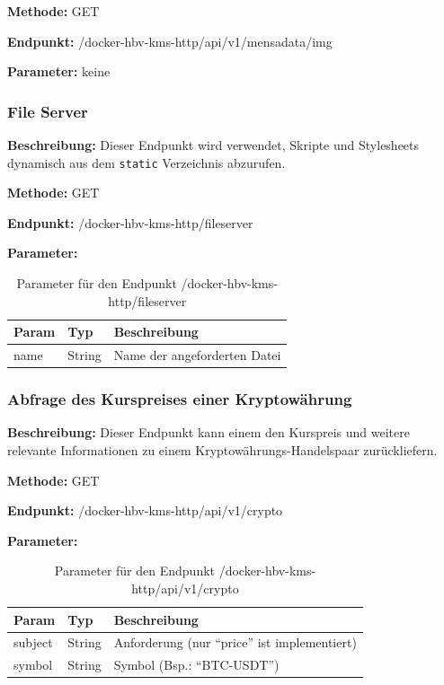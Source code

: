 \textbf{Methode:} GET

\textbf{Endpunkt:} /docker-hbv-kms-http/api/v1/mensadata/img

\textbf{Parameter:} keine

\dotfill

\subsubsection{File Server}
\label{sec:api-fileserver}
\textbf{Beschreibung:} Dieser Endpunkt wird verwendet, Skripte und Stylesheets dynamisch aus dem \verb|static| Verzeichnis
abzurufen.

\textbf{Methode:} GET

\textbf{Endpunkt:} /docker-hbv-kms-http/fileserver

\textbf{Parameter:}
\begin{table}[H]
    \label{table:/docker-hbv-kms-http/fileserver}
    \caption{Parameter für den Endpunkt /docker-hbv-kms-http/fileserver}
    \setlength{\tabcolsep}{3pt}
    \begin{tabular}{p{100pt}p{80pt}p{200pt}}
        \toprule
        Param & Typ    & Beschreibung                 \\
        \midrule
        name  & String & Name der angeforderten Datei \\
        \bottomrule
    \end{tabular}
\end{table}
\dotfill


\subsubsection{Abfrage des Kurspreises einer Kryptowährung}
\label{sec:api-crypto}
\textbf{Beschreibung:} Dieser Endpunkt kann einem den Kurspreis und weitere relevante Informationen zu einem Kryptowährungs-Handelspaar zurückliefern.

\textbf{Methode:} GET

\textbf{Endpunkt:} /docker-hbv-kms-http/api/v1/crypto

\textbf{Parameter:}
\begin{table}[H]
    \label{table:/docker-hbv-kms-http/api/v1/crypto}
    \caption{Parameter für den Endpunkt /docker-hbv-kms-http/api/v1/crypto}
    \setlength{\tabcolsep}{3pt}
    \begin{tabular}{p{100pt}p{80pt}p{200pt}}
        \toprule
        Param   & Typ    & Beschreibung                                  \\
        \midrule
        subject & String & Anforderung (nur ``price'' ist implementiert) \\
        symbol  & String & Symbol (Bsp.: ``BTC-USDT'')                   \\
        \bottomrule
    \end{tabular}
\end{table}
\dotfill

